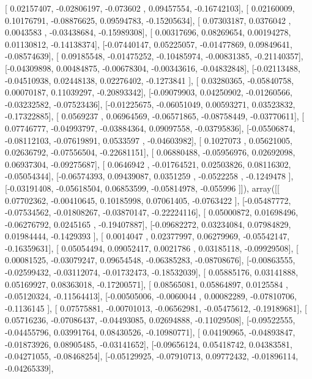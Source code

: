 \documentclass{article}
\begin{document}
       [ 0.02157407, -0.02806197, -0.073602  ,  0.09457554, -0.16742103],
       [ 0.02160009,  0.10176791, -0.08876625,  0.09594783, -0.15205634],
       [ 0.07303187,  0.0376042 ,  0.0043583 , -0.03438684, -0.15989308],
       [ 0.00317696,  0.08269654,  0.00194278,  0.01130812, -0.14138374],
       [-0.07440147,  0.05225057, -0.01477869,  0.09849641, -0.08574639],
       [ 0.09185548, -0.01475252, -0.10485974, -0.00831385, -0.21140357],
       [-0.04309898,  0.00484875, -0.00678304, -0.00343616, -0.04832848],
       [-0.02113488, -0.04510938,  0.02448138,  0.02276402, -0.1273841 ],
       [ 0.03280365, -0.05840758,  0.00070187,  0.11039297, -0.20893342],
       [-0.09079903,  0.04250902, -0.01260566, -0.03232582, -0.07523436],
       [-0.01225675, -0.06051049,  0.00593271,  0.03523832, -0.17322885],
       [ 0.0569237 ,  0.06964569, -0.06571865, -0.08758449, -0.03770611],
       [ 0.07746777, -0.04993797, -0.03884364,  0.09097558, -0.03795836],
       [-0.05506874, -0.08112103, -0.07619891,  0.0533597 , -0.04603982],
       [ 0.1027073 ,  0.05621005,  0.02636792, -0.07556504, -0.22681151],
       [ 0.06880488, -0.05956976,  0.02692098,  0.06937304, -0.09275687],
       [ 0.0646942 , -0.01764521,  0.02503826,  0.08116302, -0.05054344],
       [-0.06574393,  0.09439087,  0.0351259 , -0.0522258 , -0.1249478 ],
       [-0.03191408, -0.05618504,  0.06853599, -0.05814978, -0.055996  ]]), array([[ 0.07702362, -0.00410645,  0.10185998,  0.07061405, -0.0763422 ],
       [-0.05487772, -0.07534562, -0.01808267, -0.03870147, -0.22224116],
       [ 0.05000872,  0.01698496, -0.06276792,  0.0245165 , -0.19407887],
       [-0.09682272,  0.03234084,  0.07984829,  0.01984444, -0.1429393 ],
       [ 0.0014047 ,  0.02377997,  0.06279969, -0.05542147, -0.16359631],
       [ 0.05054494,  0.09052417,  0.0021786 ,  0.03185118, -0.09929508],
       [ 0.00081525, -0.03079247,  0.09654548, -0.06385283, -0.08708676],
       [-0.00863555, -0.02599432, -0.03112074, -0.01732473, -0.18532039],
       [ 0.05885176,  0.03141888,  0.05169927,  0.08363018, -0.17200571],
       [ 0.08565081,  0.05864897,  0.0125584 , -0.05120324, -0.11564413],
       [-0.00505006, -0.0060044 ,  0.00082289, -0.07810706, -0.1136145 ],
       [ 0.07575881, -0.00701013, -0.06562981, -0.05475612, -0.19189681],
       [ 0.05716236, -0.07086437, -0.04493085,  0.02694888, -0.11029508],
       [-0.09522555, -0.04455796,  0.03991764,  0.08430526, -0.10980771],
       [ 0.04190965, -0.04893847, -0.01873926,  0.08905485, -0.03141652],
       [-0.09656124,  0.05418742,  0.04383581, -0.04271055, -0.08468254],
       [-0.05129925, -0.07910713,  0.09772432, -0.01896114, -0.04265339],
\end{document}
